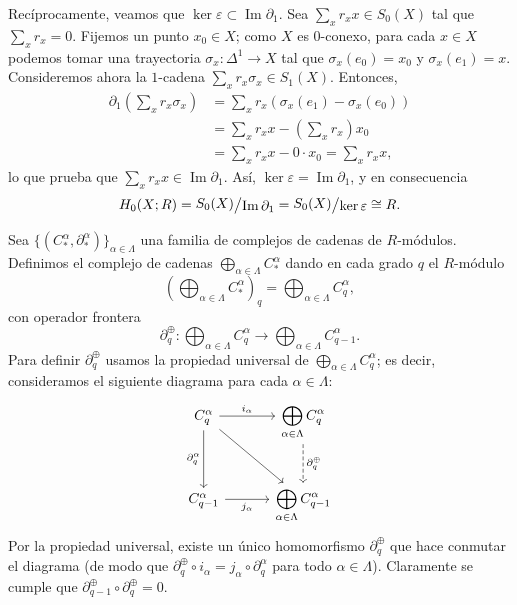 \begin{dem}
Recíprocamente, veamos que $\ker \varepsilon \subset \operatorname{Im} \partial_1$. Sea $\sum_x r_x x \in S_0(X)$ tal que $\sum_x r_x = 0$. Fijemos un punto $x_0 \in X$; como $X$ es $0$-conexo, para cada $x \in X$ podemos tomar una trayectoria $\sigma_x \colon \Delta^1 \to X$ tal que $\sigma_x(e_0) = x_0$ y $\sigma_x(e_1) = x$. Consideremos ahora la $1$-cadena $\sum_x r_x \sigma_x \in S_1(X)$. Entonces,
\begin{align*}
\partial_1\left(\sum_x r_x \sigma_x\right) &= \sum_x r_x (\sigma_x(e_1) - \sigma_x(e_0)) \\
&= \sum_x r_x x - \left(\sum_x r_x\right) x_0 \\
&= \sum_x r_x x - 0 \cdot x_0 = \sum_x r_x x,
\end{align*}
lo que prueba que $\sum_x r_x x \in \operatorname{Im} \partial_1$. Así, $\ker \varepsilon = \operatorname{Im} \partial_1$, y en consecuencia
\[
H_0(X; R) = \raisebox{0.2ex}{$S_0(X)$} \big/ \raisebox{-0.2ex}{$\operatorname{Im} \partial_1$} = \raisebox{0.2ex}{$S_0(X)$} \big/ \raisebox{-0.2ex}{$\ker \varepsilon$} \cong R.
\]
\end{dem}
\begin{definicion}
Sea $\{(C_*^\alpha, \partial_*^\alpha)\}_{\alpha \in \Lambda}$ una familia de complejos de cadenas de $R$-módulos. Definimos el complejo de cadenas $\bigoplus_{\alpha \in \Lambda} C_*^\alpha$ dando en cada grado $q$ el $R$-módulo
\[
\left( \bigoplus_{\alpha \in \Lambda} C_*^\alpha \right)_q = \bigoplus_{\alpha \in \Lambda} C_q^\alpha,
\]
con operador frontera
\[
\partial_q^\oplus \colon \bigoplus_{\alpha \in \Lambda} C_q^\alpha \longrightarrow \bigoplus_{\alpha \in \Lambda} C_{q-1}^\alpha.
\]
Para definir $\partial_q^\oplus$ usamos la propiedad universal de $\bigoplus_{\alpha \in \Lambda} C_q^\alpha$; es decir, consideramos el siguiente diagrama para cada $\alpha \in \Lambda$:
\[
\begin{tikzcd}[column sep=3.2em, row sep=2.8em]
C_q^\alpha \arrow[r, "i_\alpha"] \arrow[d, "\partial_q^\alpha"'] \arrow[dr] & \displaystyle\bigoplus_{\alpha \in \Lambda} C_q^\alpha \arrow[d, dashed, "\partial_q^\oplus"] \\
C_{q-1}^\alpha \arrow[r, "j_\alpha"'] & \displaystyle\bigoplus_{\alpha \in \Lambda} C_{q-1}^\alpha
\end{tikzcd}
\]
Por la propiedad universal, existe un único homomorfismo $\partial_q^\oplus$ que hace conmutar el diagrama (de modo que $\partial_q^\oplus \circ i_\alpha = j_\alpha \circ \partial_q^\alpha$ para todo $\alpha \in \Lambda$). Claramente se cumple que $\partial_{q-1}^\oplus \circ \partial_q^\oplus = 0$.
\end{definicion}

